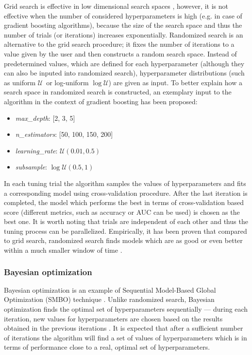 \documentclass[magisterska, english]{pwr_wmat_praca_dyplomowa}
\theoremstyle{plain}
\numberwithin{theorem}{chapter}
\theoremstyle{definition}
\numberwithin{theorem}{chapter}
\newcommand{\U}{$\mathcal{U}$}
\newcommand{\logU}{$\log\mathcal{U}$}
\begin{document}
Grid search is effective in low dimensional search spaces \cite{randomized}, however, it is not effective when the number of considered hyperparameters is high (e.g. in case of gradient boosting algorithms), because the size of the search space and thus the number of trials (or iterations) increases exponentially. Randomized search is an alternative to the grid search procedure; it fixes the number of iterations to a value given by the user and then constructs a random search space. Instead of predetermined values, which are defined for each hyperparameter (although they can also be inputed into randomized search), hyperparameter distributions (such as uniform \U\, or log-uniform \logU) are given as input. To better explain how a search space in randomized search is constructed, an exemplary input to the algorithm in the context of gradient boosting has been proposed:
\begin{itemize}
    \item\emph{max\_depth}: [2, 3, 5]
    \item\emph{n\_estimators}: [50, 100, 150, 200]
    \item\emph{learning\_rate}: $\mathcal{U}(0.01, 0.5)$
    \item\emph{subsample}: $\log\mathcal{U}(0.5, 1)$
\end{itemize}
In each tuning trial the algorithm samples the values of hyperparameters and fits a corresponding model using cross-validation procedure. After the last iteration is completed, the model which performs the best in terms of cross-validation based score (different metrics, such as accuracy or AUC can be used) is chosen as the best one. It is worth noting that trials are independent of each other and thus the tuning process can be parallelized.
Empirically, it has been proven that compared to grid search, randomized search finds models which are as good or even better within a much smaller window of time \cite{randomized}.

\subsubsection{Bayesian optimization}
Bayesian optimization is an example of Sequential Model-Based Global Optimization (SMBO) technique \cite{tpe}. Unlike randomized search, Bayesian optimization finds the optimal set of hyperparameters sequentially --- during each iteration, new values for hyperparameters are chosen based on the results obtained in the previous iterations \cite{tpe}. It is expected that after a sufficient number of iterations the algorithm will find a set of values of hyperparameters which is in terms of performance close to a real, optimal set of hyperparameters.
\end{document}

